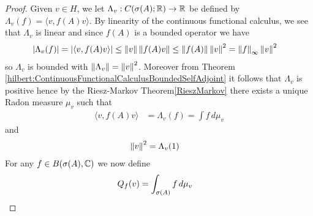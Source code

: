 \begin{proof}
Given $v \in H$, we let $\Lambda_v : C(\sigma(A); \mathbb{R}) \to \mathbb{R}$ be defined by $\Lambda_v(f) = \langle v, f(A) v \rangle$.  By linearity of the continuous functional calculus, we see that $\Lambda_v$ is linear and since $f(A)$ is a bounded operator we have 
\begin{align*}
\left \vert \Lambda_v(f) \right \vert &=\left \vert \langle v, f(A) v \rangle \right \vert \leq \left \lVert v \right \rVert \left \lVert f(A) v \right \rVert \leq \left \lVert f(A) \right \rVert \left \lVert v \right \rVert^2 = \left \lVert f \right \rVert_\infty \left \lVert v \right \rVert^2
\end{align*}
so $\Lambda_v$ is bounded with $\left \lVert \Lambda_v \right \rVert = \left \lVert v \right \rVert^2$.  Moreover from Theorem \ref{hilbert:ContinuousFunctionalCalculusBoundedSelfAdjoint} it follows that $\Lambda_v$ is positive hence by the Riesz-Markov Theorem\ref{RieszMarkov} there exists a unique Radon measure $\mu_v$ such that 
\begin{align*}
\langle v, f(A) v \rangle &= \Lambda_v(f) = \int f \, d\mu_v
\end{align*}
and
\begin{align*}
\left \lVert v \right \rVert^2 &= \Lambda_v(1) 
\end{align*}
For any $f \in B(\sigma(A), \mathbb{C})$ we now define
\begin{align*}
Q_f(v) &= \int_{\sigma(A)} f \, d\mu_v
\end{align*}


\end{proof}
